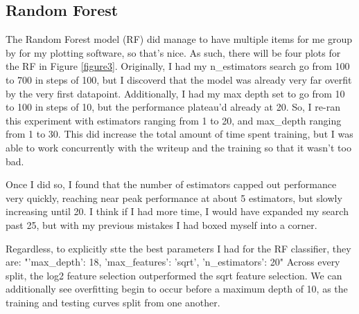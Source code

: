 \documentclass[12pt]{article}
\begin{document}
\subsection{Random Forest}
The Random Forest model (RF) did manage to have multiple items for me group by for my plotting software, so that's nice. 
As such, there will be four plots for the RF in Figure \ref{figure3}. Originally, I had my n\_estimators search go from 
100 to 700 in steps of 100, but I discoverd that the model was already very far overfit by the very first datapoint. 
Additionally, I had my max depth set to go from 10 to 100 in steps of 10, but the performance plateau'd already at 20.
So, I re-ran this experiment with estimators ranging from 1 to 20,  and max\_depth ranging from 1 to 30. This did increase
the total amount of time spent training, but I was able to work concurrently with the writeup and the training so that 
it wasn't too bad.

Once I did so, I found that the number of estimators capped out performance very quickly, reaching near peak performance 
at about 5 estimators, but slowly increasing until 20. I think if I had more time, I would have expanded my search past
25, but with my previous mistakes I had boxed myself into a corner.

Regardless, to explicitly stte the best parameters I had for the RF classifier, they are: "{'max\_depth': 18, 'max\_features': 'sqrt', 'n\_estimators': 20}"
Across every split, the log2 feature selection outperformed the sqrt feature selection. We can additionally see overfitting 
begin to occur before a maximum depth of 10, as the training and testing curves split from one another. 
\end{document}
